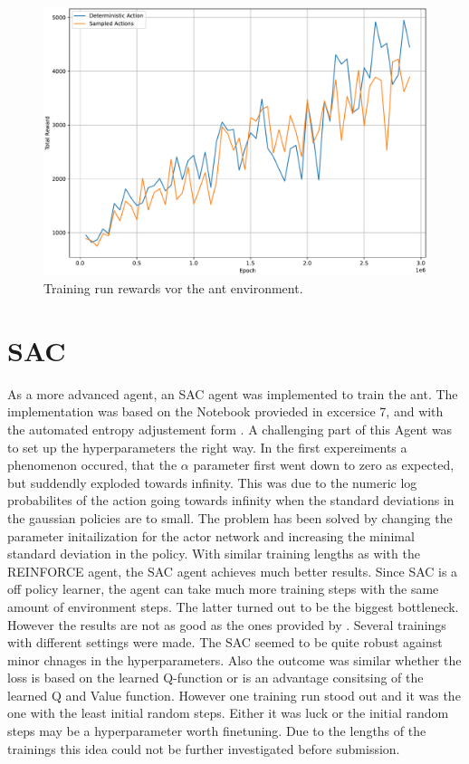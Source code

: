 \documentclass[11pt, a4paper]{article}
\begin{document}
\begin{figure}
    \centering
    \includegraphics[width=15cm]{stoc_det.pdf}
    \caption{Training run rewards vor the ant environment.}
    \label{SAC:test1}
\end{figure}

\newpage
\section{SAC}
As a more advanced agent, an SAC agent was implemented to train the ant.
The implementation was based on the Notebook provieded in excersice 7, and \cite{haarnoja2018soft} with
the automated entropy adjustement form \cite{haarnoja2019soft}.
A challenging part of this Agent was to set up the hyperparameters the right way.
In the first expereiments a phenomenon occured, that the $\alpha$ parameter first went down to zero as
expected, but suddendly exploded towards infinity.
This was due to the numeric log probabilites of the action going towards infinity when the standard deviations
in the gaussian policies are to small.
The problem has been solved by changing the parameter initailization for the actor network and increasing the minimal
standard deviation in the policy.
With similar training lengths as with the REINFORCE agent, the SAC agent achieves much better results.
Since SAC is a off policy learner, the agent can take much more training steps with the same amount of environment steps.
The latter turned out to be the biggest bottleneck.
However the results are not as good as the ones provided by \cite{haarnoja2018soft}.
Several trainings with different settings were made.
The SAC seemed to be quite robust against minor chnages in the hyperparameters.
Also the outcome was similar whether the loss is based on the learned Q-function or
is an advantage consitsing of the learned Q and Value function.
However one training run stood out and it was the one with the least initial random steps.
Either it was luck or the initial random steps may be a hyperparameter worth finetuning.
Due to the lengths of the trainings this idea could not be further investigated before submission.
\end{document}
